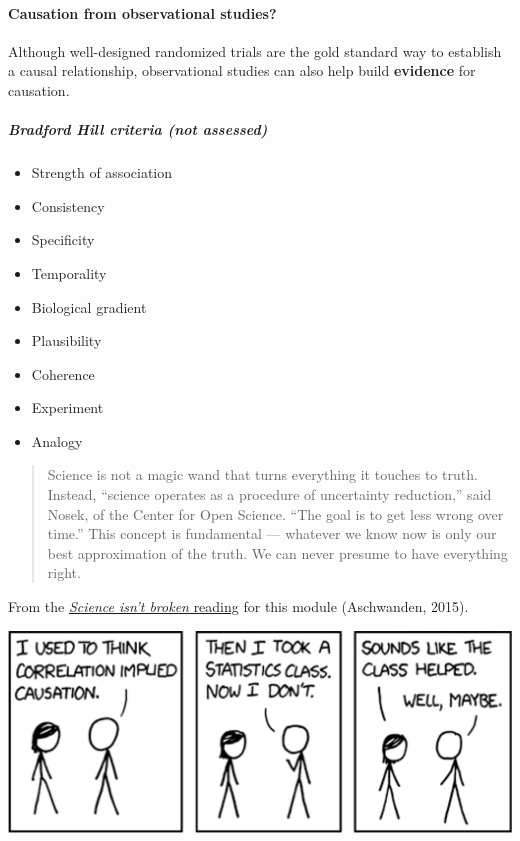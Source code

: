 \documentclass[
  openany]{book}
\providecommand{\tightlist}{%
  \setlength{\itemsep}{0pt}\setlength{\parskip}{0pt}}
\begin{document}
\hypertarget{causation-from-observational-studies}{%
\paragraph{Causation from observational studies?}\label{causation-from-observational-studies}}

Although well-designed randomized trials are the gold standard way to establish a causal
relationship, observational studies can also help build \textbf{evidence} for causation.

\hypertarget{bradford-hill-criteria-not-assessed}{%
\subparagraph{Bradford Hill criteria (not assessed)}\label{bradford-hill-criteria-not-assessed}}

\begin{itemize}
\tightlist
\item
  Strength of association
\item
  Consistency
\item
  Specificity
\item
  Temporality
\item
  Biological gradient
\item
  Plausibility
\item
  Coherence
\item
  Experiment
\item
  Analogy
\end{itemize}

\begin{quote}
Science is not a magic wand that turns everything it touches to truth. Instead, ``science operates as a procedure of uncertainty reduction,'' said Nosek, of the Center for Open Science. ``The goal is to get less wrong over time.'' This concept is fundamental --- whatever we know now is only our best approximation of the truth. We can never presume to have everything right.
\end{quote}

From the \href{https://fivethirtyeight.com/features/science-isnt-broken}{\emph{Science isn't broken} reading} for this module (Aschwanden, 2015).

\begin{center}\includegraphics[width=0.9\linewidth]{images/m2/xkcd_552} \end{center}
\end{document}
